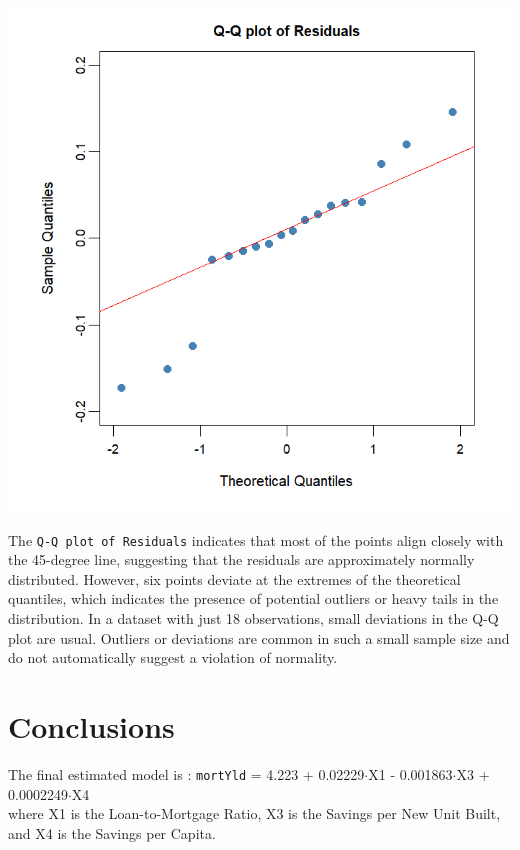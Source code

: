 \documentclass[
  11pt,
]{article}
\begin{document}
\begin{minipage}{0.35\textwidth}
\centering
\includegraphics[width=1\linewidth]{qqplot_residuals.png}
\end{minipage}
\hfill
\begin{minipage}{0.6\textwidth}
\small
The \texttt{Q-Q plot of Residuals} indicates that most of the points align closely with the 45-degree line, suggesting that the residuals are approximately normally distributed. However, six points deviate at the extremes of the theoretical quantiles, which indicates the presence of potential outliers or heavy tails in the distribution. In a dataset with just 18 observations, small deviations in the Q-Q plot are usual. Outliers or deviations are common in such a small sample size and do not automatically suggest a violation of normality.
\end{minipage}

\section{Conclusions}\label{conclusions}

\hfill\break
The final estimated model is : \texttt{mortYld} = 4.223 +
0.02229\(\cdot\)X1 - 0.001863\(\cdot\)X3 + 0.0002249\(\cdot\)X4\\
where X1 is the Loan-to-Mortgage Ratio, X3 is the Savings per New Unit
Built, and X4 is the Savings per Capita.
\end{document}
